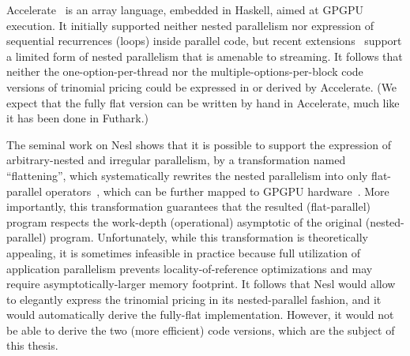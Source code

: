 Accelerate~\cite{Accelerate-ICFP} is an array language, embedded in Haskell, aimed at GPGPU execution. It initially supported neither nested parallelism nor expression of sequential recurrences (loops) inside parallel code, but recent extensions~\cite{AccelerateStreaming} support a limited form of nested parallelism that is amenable to streaming. It follows that neither the one-option-per-thread nor the multiple-options-per-block code versions of trinomial pricing could be expressed in or derived by Accelerate. (We expect that the fully flat version can be written by hand in Accelerate, much like it has been done in Futhark.) 

The seminal work on Nesl shows that it is possible to support the expression of arbitrary-nested and irregular parallelism, by a transformation named ``flattening'', which systematically rewrites the nested parallelism into only flat-parallel operators~\cite{blelloch1994implementation}, which can be further mapped to GPGPU hardware~\cite{Bergstrom:2012:NDG:2398856.2364563}.  More importantly, this transformation guarantees that the resulted (flat-parallel) program respects the work-depth (operational) asymptotic of the original (nested-parallel) program. Unfortunately, while this transformation is theoretically appealing, it is sometimes infeasible in practice because full utilization of application parallelism prevents locality-of-reference optimizations and may require asymptotically-larger memory footprint.   It follows that Nesl would allow to elegantly express the trinomial pricing in its nested-parallel fashion, and it would automatically derive the fully-flat implementation. However, it would not be able to derive the two (more efficient) code versions, which are the subject of this thesis.

